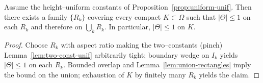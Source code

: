 \begin{proposition}\label{prop:overlap-propagation}
Assume the height–uniform constants of Proposition~\ref{prop:uniform-unif}. Then there exists a family $\{R_k\}$ covering every compact $K\subset\Omega$ such that $|\Theta|\le1$ on each $R_k$ and therefore on $\bigcup_k R_k$. In particular, $|\Theta|\le1$ on $K$.
\end{proposition}

\begin{proof}
Choose $R_k$ with aspect ratio making the two–constants (pinch) Lemma~\ref{lem:two-const-unif} arbitrarily tight; boundary wedge on $I_k$ yields $|\Theta|\le 1$ on each $R_k$. Bounded overlap and Lemma~\ref{lem:union-rectangles} imply the bound on the union; exhaustion of $K$ by finitely many $R_k$ yields the claim.
\end{proof}
